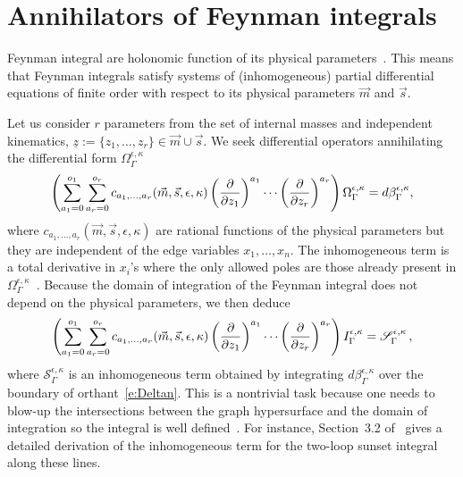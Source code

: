 \documentclass[a4paper,12pt]{article}
\numberwithin{equation}{section}
\numberwithin{figure}{section}
\begin{document}
\section{Annihilators of Feynman integrals}
\label{sec:Red}
Feynman integral are holonomic function of its physical parameters~\cite{Kashiwara:1977nf, Bitoun:2017nre, Smirnov:2010hn,Lee:2013hzt}. This means that Feynman integrals satisfy systems of  (inhomogeneous) partial
differential equations of finite order with respect to its physical
parameters $\vec m$ and $\vec s$.

Let us consider $r$ parameters from the set of internal masses and independent kinematics, $\underline z:=\{z_1,\dots,z_r\} \in \vec m \cup \vec s $. 
%
We seek 
differential operators 
annihilating the differential form $\Omega_\Gamma^{\epsilon,\kappa}$ 
\begin{equation}\label{e:PFOmegaGeneric}
	\left(  \sum_{a_1=0}^{o_1} \sum_{ a_r=0}^{o_r} c_{a_1,\dots,a_r}(\vec m,\vec s,\epsilon,\kappa)\left(\partial\over \partial z_1\right)^{a_1}\cdots\left(\partial
	\over\partial z_r\right)^{a_r}  \right)\Omega_\Gamma^{\epsilon,\kappa}=d\beta^{\epsilon,\kappa}_\Gamma,
\end{equation}
where $c_{a_1,\dots,a_r}(\vec m,\vec s,\epsilon,\kappa)$ are rational functions of the physical
parameters but they are independent of the edge variables $x_1,\dots,x_n$. The inhomogeneous term is a total derivative in $x_i$'s where the only allowed poles are those already present in $\Omega_\Gamma^{\epsilon,\kappa}$~\cite{Lairez:2022zkj}.
%
Because the domain of integration of the Feynman integral does not
depend on the physical parameters, we then deduce
\begin{equation}\label{e:PDEintFeynman}
	\left( \sum_{a_1=0}^{o_1} \sum_{ a_r=0}^{o_r} c_{a_1,\dots,a_r}(\vec m,\vec s,\epsilon,\kappa)\left(\partial\over \partial z_1\right)^{a_1}\cdots\left(\partial
	\over\partial z_r\right)^{a_r}  \right)I^{\epsilon,\kappa}_\Gamma=\mathscr{S}^{\epsilon,\kappa}_\Gamma \, ,
\end{equation}
where $\mathscr{S}^{\epsilon,\kappa}_\Gamma$ is an inhomogeneous term obtained by
integrating $d\beta^{\epsilon,\kappa}_\Gamma$ over the boundary of
orthant~\eqref{e:Deltan}.
This is a nontrivial task because one needs
to blow-up the intersections between the graph hypersurface and the
domain of integration so the integral is well
defined~\cite{bek,Brown:2009ta,Bloch:2016izu,muller2014picard}. For
instance, 
Section~3.2 of~\cite{Bloch:2016izu} gives  a detailed derivation of the inhomogeneous term for
the two-loop sunset integral along these lines.
\end{document}
